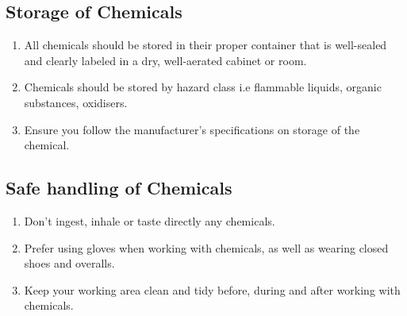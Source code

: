 \documentclass[12pt,letterpaper]{article}
\begin{document}
        \subsection{Storage of Chemicals}
            \begin{enumerate}
                \begin{enumerate}
                \item All chemicals should be stored in their proper
                container that is well-sealed and clearly labeled in a
                dry, well-aerated cabinet or room.
                \item Chemicals should be stored by hazard class i.e
                flammable liquids, organic substances, oxidisers.\footnotemark[1]\footnotemark[2]
                \item Ensure you follow the manufacturer's specifications
                on storage of the chemical.\footnotemark[3]
                \end{enumerate}
            \end{enumerate}
        \subsection{Safe handling of Chemicals}
            \begin{enumerate}
                \begin{enumerate}
                    \item Don't ingest, inhale or taste directly any chemicals.\footnotemark[4]
                    \item Prefer using gloves when working with chemicals, as well as wearing closed
                    shoes and overalls.\footnotemark[5]
                    \item Keep your working area clean and tidy before, during and after working with chemicals.\footnotemark[6]
                \end{enumerate}
            \end{enumerate}
\end{document}
